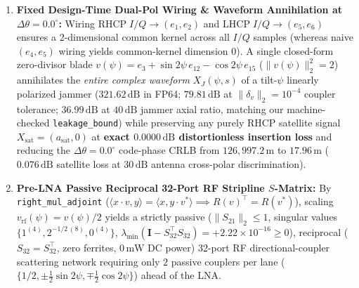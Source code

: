 \documentclass[11pt,a4paper]{article}
\theoremstyle{definition}
\theoremstyle{remark}
\begin{document}
\begin{enumerate}
    \item \textbf{Fixed Design-Time Dual-Pol Wiring \& Waveform Annihilation at $\Delta\theta = 0.0^\circ$:} Wiring $\mathrm{RHCP}\;I/Q \to (e_1, e_2)$ and $\mathrm{LHCP}\;I/Q \to (e_5, e_6)$ ensures a 2-dimensional common kernel across all $I/Q$ samples (whereas naive $(e_4, e_5)$ wiring yields common-kernel dimension $0$). A single closed-form zero-divisor blade $v(\psi) = e_3 + \sin 2\psi\,e_{12} - \cos 2\psi\,e_{15}$ ($\|v(\psi)\|_2^2 = 2$) annihilates the \emph{entire complex waveform} $X_J(\psi, s)$ of a tilt-$\psi$ linearly polarized jammer ($321.62\,\mathrm{dB}$ in FP64; $79.81\,\mathrm{dB}$ at $\|\delta_v\|_2 = 10^{-4}$ coupler tolerance; $36.99\,\mathrm{dB}$ at $40\,\mathrm{dB}$ jammer axial ratio, matching our machine-checked \texttt{leakage\_bound}) while preserving any purely RHCP satellite signal $X_{\mathrm{sat}} = (a_{\mathrm{sat}}, 0)$ at \textbf{exact $0.0000\,\mathrm{dB}$ distortionless insertion loss} and reducing the $\Delta\theta = 0.0^\circ$ code-phase CRLB from $126{,}997.2\,\mathrm{m}$ to $\mathbf{17.96\,\mathrm{m}}$ ($0.076\,\mathrm{dB}$ satellite loss at $30\,\mathrm{dB}$ antenna cross-polar discrimination).
    \item \textbf{Pre-LNA Passive Reciprocal 32-Port RF Stripline $S$-Matrix:} By \texttt{right\_mul\_adjoint} ($\langle x\cdot v, y\rangle = \langle x, y\cdot v^*\rangle \implies R(v)^\top = R(v^*)$), scaling $v_{\mathrm{rf}}(\psi) = v(\psi)/2$ yields a strictly passive ($\|S_{21}\|_2 \le 1$, singular values $\{1^{(4)}, 2^{-1/2\,(8)}, 0^{(4)}\}$, $\lambda_{\min}(\bm{I} - S_{32}^\top S_{32}) = +2.22\times 10^{-16} \ge 0$), reciprocal ($S_{32} = S_{32}^\top$, zero ferrites, $0\,\mathrm{mW}$ DC power) 32-port RF directional-coupler scattering network requiring only $2$ passive couplers per lane ($\{1/2, \pm\frac{1}{2}\sin 2\psi, \mp\frac{1}{2}\cos 2\psi\}$) ahead of the LNA.

\end{enumerate}
\end{document}
